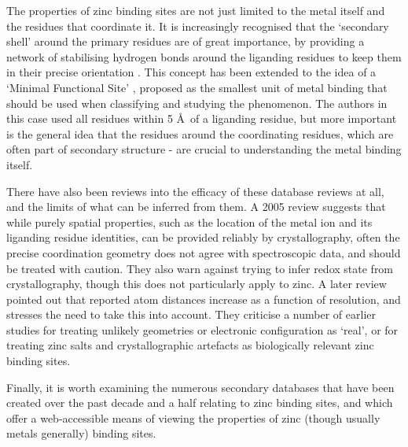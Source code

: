 The properties of zinc binding sites are not just limited to the metal itself and the residues that coordinate it. It is increasingly recognised that the `secondary shell' around the primary residues are of great importance, by providing a network of stabilising hydrogen bonds around the liganding residues to keep them in their precise orientation \cite{auld2001zinc}. This concept has been extended to the idea of a `Minimal Functional Site' \cite{andreini2011minimal}, proposed as the smallest unit of metal binding that should be used when classifying and studying the phenomenon. The authors in this case used all residues within 5 \AA \ of a liganding residue, but more important is the general idea that the residues around the coordinating residues, which are often part of secondary structure - are crucial to understanding the metal binding itself.

There have also been reviews into the efficacy of these database reviews at all, and the limits of what can be inferred from them. A 2005 review \cite{sommerhalter2005x} suggests that while purely spatial properties, such as the location of the metal ion and its liganding residue identities, can be provided reliably by crystallography, often the precise coordination geometry does not agree with spectroscopic data, and should be treated with caution. They also warn against trying to infer redox state from crystallography, though this does not particularly apply to zinc. A later review \cite{laitaoja2013zinc} pointed out that reported atom distances increase as a function of resolution, and stresses the need to take this into account. They criticise a number of earlier studies for treating unlikely geometries or electronic configuration as `real', or for treating zinc salts and crystallographic artefacts as biologically relevant zinc binding sites.

Finally, it is worth examining the numerous secondary databases that have been created over the past decade and a half relating to zinc binding sites, and which offer a web-accessible means of viewing the properties of zinc (though usually metals generally) binding sites.

